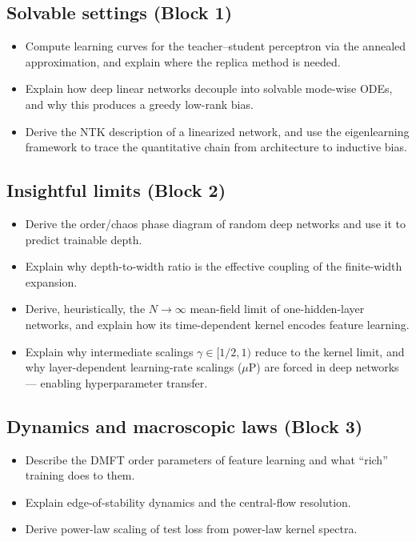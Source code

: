 \documentclass[11pt]{article}
\begin{document}
\begin{learningoutcomes}
  \subsection*{Solvable settings (Block 1)}
  \begin{itemize}
    \item Compute learning curves for the teacher--student perceptron via the annealed approximation, and explain where the replica method is needed.
    \item Explain how deep linear networks decouple into solvable mode-wise ODEs, and why this produces a greedy low-rank bias.
    \item Derive the NTK description of a linearized network, and use the eigenlearning framework to trace the quantitative chain from architecture to inductive bias.
  \end{itemize}

  \subsection*{Insightful limits (Block 2)}
  \begin{itemize}
    \item Derive the order/chaos phase diagram of random deep networks and use it to predict trainable depth.
    \item Explain why depth-to-width ratio is the effective coupling of the finite-width expansion.
    \item Derive, heuristically, the $N\to\infty$ mean-field limit of one-hidden-layer networks, and explain how its time-dependent kernel encodes feature learning.
    \item Explain why intermediate scalings $\gamma \in [1/2,1)$ reduce to the kernel limit, and why layer-dependent learning-rate scalings ($\mu$P) are forced in deep networks --- enabling hyperparameter transfer.
  \end{itemize}

  \subsection*{Dynamics and macroscopic laws (Block 3)}
  \begin{itemize}
    \item Describe the DMFT order parameters of feature learning and what ``rich'' training does to them.
    \item Explain edge-of-stability dynamics and the central-flow resolution.
    \item Derive power-law scaling of test loss from power-law kernel spectra.
  \end{itemize}
\end{learningoutcomes}
\end{document}
